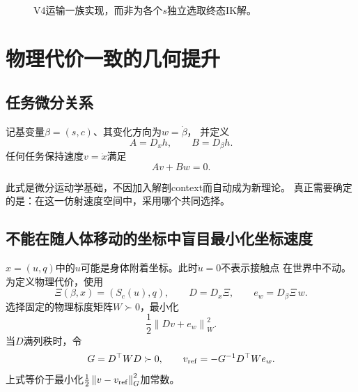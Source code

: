 \documentclass[UTF8,11pt,a4paper,fontset=fandol]{ctexart}
\numberwithin{equation}{section}
\theoremstyle{definition}
\newcommand{\norm}[1]{\left\lVert#1\right\rVert}
\begin{document}
\begin{figure}[htbp]\centering
{}
\caption{V4运输一族实现，而非为各个$s$独立选取终态IK解。}
\end{figure}

\section{物理代价一致的几何提升}

\subsection{任务微分关系}

记基变量$\beta=(s,c)$、其变化方向为$w=\dot\beta$，
并定义
\begin{equation}
 A=D_xh,\qquad B=D_\beta h.
\end{equation}
任何任务保持速度$v=\dot x$满足
\begin{equation}
 \boxed{Av+Bw=0.}
 \label{eq:tangent}
\end{equation}

此式是微分运动学基础，不因加入解剖context而自动成为新理论。
真正需要确定的是：在这一仿射速度空间中，采用哪个共同选择。

\subsection{不能在随人体移动的坐标中盲目最小化坐标速度}

$x=(u,q)$中的$u$可能是身体附着坐标。此时$\dot u=0$不表示接触点
在世界中不动。为定义物理代价，使用
\begin{equation}
 \Xi(\beta,x)=(S_c(u),q),\qquad
 D=D_x\Xi,\qquad e_w=D_\beta\Xi\,w.
\end{equation}
选择固定的物理标度矩阵$W\succ0$，最小化
\begin{equation}
 \frac12\norm{Dv+e_w}_W^2.
\end{equation}
当$D$满列秩时，令
\begin{equation}
 G=D^\top WD\succ0,\qquad
 v_{\rm ref}=-G^{-1}D^\top We_w.
\end{equation}
上式等价于最小化$\frac12\norm{v-v_{\rm ref}}_G^2$加常数。
\end{document}
